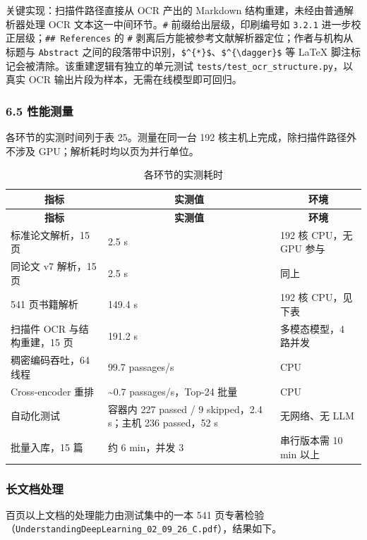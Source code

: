 \documentclass[UTF8,fontset=windows,zihao=5,a4paper]{ctexart}
\begin{document}
关键实现：扫描件路径直接从 OCR 产出的 Markdown 结构重建，未经由普通解析器处理 OCR 文本这一中间环节。\texttt{\#} 前缀给出层级，印刷编号如 \texttt{3.2.1} 进一步校正层级；\texttt{\#\# References} 的 \texttt{\#} 剥离后方能被参考文献解析器定位；作者与机构从标题与 \texttt{Abstract} 之间的段落带中识别，\texttt{\$\textasciicircum{}\{*\}\$}、\texttt{\$\textasciicircum{}\{\textbackslash{}dagger\}\$} 等 LaTeX 脚注标记会被清除。该重建逻辑有独立的单元测试 \texttt{tests/test\_\allowbreak{}ocr\_\allowbreak{}structure.py}，以真实 OCR 输出片段为样本，无需在线模型即可回归。

\subsubsection*{6.5 性能测量}
各环节的实测时间列于表 25。测量在同一台 192 核主机上完成，除扫描件路径外不涉及 GPU；解析耗时均以页为并行单位。

\begin{longtable}{@{}p{}p{}p{}@{}}
\caption{各环节的实测耗时}\\
\toprule
\multicolumn{1}{c}{\textbf{指标}} & \multicolumn{1}{c}{\textbf{实测值}} & \multicolumn{1}{c}{\textbf{环境}} \\
\midrule
\endfirsthead
\toprule
\multicolumn{1}{c}{\textbf{指标}} & \multicolumn{1}{c}{\textbf{实测值}} & \multicolumn{1}{c}{\textbf{环境}} \\
\midrule
\endhead
\bottomrule
\endfoot
标准论文解析，15 页 & 2.5 s & 192 核 CPU，无 GPU 参与 \\
同论文 v7 解析，15 页 & 2.5 s & 同上 \\
541 页书籍解析 & 149.4 s & 192 核 CPU，见下表 \\
扫描件 OCR 与结构重建，15 页 & 191.2 s & 多模态模型，4 路并发 \\
稠密编码吞吐，64 线程 & 99.7 passages/s & CPU \\
Cross-encoder 重排 & \textasciitilde{}0.7 passages/s，Top-24 批量 & CPU \\
自动化测试 & 容器内 227 passed / 9 skipped，2.4 s；主机 236 passed，52 s & 无网络、无 LLM \\
批量入库，15 篇 & 约 6 min，并发 3 & 串行版本需 10 min 以上 \\
\end{longtable}

\subsubsection*{长文档处理}
百页以上文档的处理能力由测试集中的一本 541 页专著检验（\texttt{UnderstandingDeepLearning\_\allowbreak{}02\_\allowbreak{}09\_\allowbreak{}26\_\allowbreak{}C.pdf}），结果如下。
\end{document}

